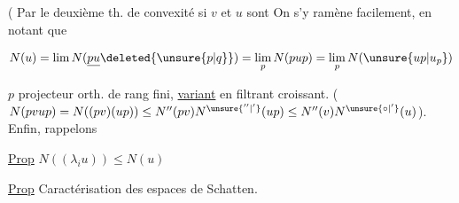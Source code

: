 (  Par le deuxième th. de convexité si $v$ et $u$ sont    On s'y ramène facilement, en notant que 

\[
N(u)=\lim N(\underline{pu}\deleted{\unsure{p|q}})=\lim_p N(pup)=\lim_p N(\unsure{up|u_p})
\]

$p$ projecteur orth. de rang fini, \uline{variant} en filtrant croissant. ( $N(pvup)=N((pv)(up))\leq N''(pv)N^{\unsure{''|'}}(up)\leq N''(v)N^{\unsure{\circ|'}}(u)$). Enfin, rappelons

\uline{Prop} $N((\lambda_i u))\leq N(u)$

\uline{Prop} Caractérisation des espaces de Schatten.


